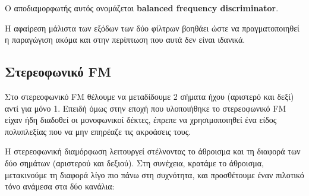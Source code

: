 \documentclass[11pt,a4paper,notitlepage,fleqn]{article}
\begin{document}

Ο αποδιαμορφωτής αυτός ονομάζεται \textbf{balanced frequency discriminator}.

Η αφαίρεση μάλιστα των εξόδων των δύο φίλτρων βοηθάει ώστε να πραγματοποιηθεί η παραγώγιση
ακόμα και στην περίπτωση που αυτά δεν είναι ιδανικά.

\subsection{Στερεοφωνικό FM}
Στο στερεοφωνικό FM θέλουμε να μεταδίδουμε 2 σήματα ήχου (αριστερό και δεξί) αντί για μόνο 1.
Επειδή όμως στην εποχή που υλοποιήθηκε το στερεοφωνικό FM είχαν ήδη διαδοθεί οι μονοφωνικοί
δέκτες, έπρεπε να χρησιμοποιηθεί ένα είδος πολυπλεξίας που να μην επηρέαζε τις ακροάσεις τους.

Η στερεοφωνική διαμόρφωση λειτουργεί στέλνοντας το άθροισμα και τη διαφορά των δύο σημάτων
(αριστερού και δεξιού). Στη συνέχεια, κρατάμε το άθροισμα, μετακινούμε τη διαφορά λίγο
πιο πάνω στη συχνότητα, και προσθέτουμε έναν πιλοτικό τόνο ανάμεσα στα δύο κανάλια:
\end{document}
